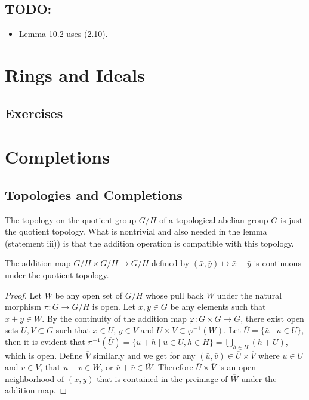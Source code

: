 \documentclass{note}
\begin{document}
\section*{TODO:}

\begin{itemize}
\item Lemma 10.2 uses (2.10).
\end{itemize}


\chapter{Rings and Ideals}

\section*{Exercises}
\setcounter{chapter}{9}


\chapter{Completions}

\section*{Topologies and Completions}

The topology on the quotient group $G/H$ of a topological abelian
group $G$ is just the quotient topology. What is nontrivial and also
needed in the lemma (statement iii)) is that the addition operation is
compatible with this topology.

\begin{lemma*}
  The addition map $G/H \times G/H \to G/H$ defined by
  $(\bar{x},\bar{y}) \mapsto \bar{x}+\bar{y}$ is continuous under the
  quotient topology.
\end{lemma*}

\begin{proof}
  Let $\overline{W}$ be any open set of $G/H$ whose pull back $W$
  under the natural morphism $\pi\colon G \to G/H$ is open. Let
  $x,y \in G$ be any elements such that $x + y \in W$. By the
  continuity of the addition map $\varphi\colon G \times G \to G$,
  there exist open sets $U,V \subset G$ such that $x\in U$, $y\in V$
  and $U\times V \subset \varphi^{-1}(W)$. Let
  $\overline{U} = \{\bar{u} \mid u \in U\}$, then it is evident that
  $\pi^{-1}\left(\overline{U}\right) = \{u+h \mid u \in U, h \in H\} =
  \bigcup_{h\in H}(h+U)$, which is open. Define $\overline{V}$
  similarly and we get for any
  $(\bar{u},\bar{v}) \in \overline{U}\times\overline{V}$ where
  $u \in U$ and $v \in V$, that $u + v \in W$, or
  $\bar{u} + \bar{v} \in \overline{W}$. Therefore
  $\overline{U} \times \overline{V}$ is an open neighborhood of
  $(\bar{x},\bar{y})$ that is contained in the preimage of
  $\overline{W}$ under the addition map.
\end{proof}
\end{document}
